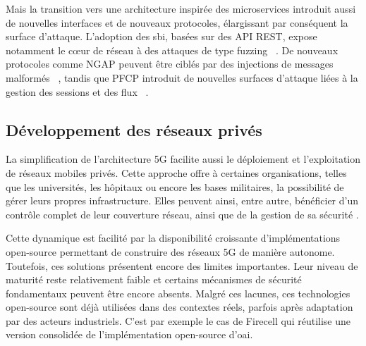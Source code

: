 \documentclass[a4paper,11pt,twoside]{StyleThese}
\begin{document}
Mais la transition vers une architecture inspirée des microservices introduit aussi de nouvelles interfaces et de nouveaux protocoles, élargissant par conséquent la surface d’attaque. L’adoption des \gls{sbi}, basées sur des API REST, expose notamment le cœur de réseau à des attaques de type fuzzing ~\cite{CTD5G}. De nouveaux protocoles comme NGAP peuvent être ciblés par des injections de messages malformés ~\cite{salazar2023network}, tandis que PFCP introduit de nouvelles surfaces d’attaque liées à la gestion des sessions et des flux ~\cite{amponis20235g}.


\subsection{Développement des réseaux privés}
La simplification de l'architecture 5G facilite aussi le déploiement et l’exploitation de réseaux mobiles privés. Cette approche offre à certaines organisations, telles que les universités, les hôpitaux ou encore les bases militaires, la possibilité de gérer leurs propres infrastructure. Elles peuvent ainsi, entre autre, bénéficier d’un contrôle complet de leur couverture réseau, ainsi que de la gestion de sa sécurité \cite{priv5G}. 

Cette dynamique est facilité par la disponibilité croissante d’implémentations open-source permettant de construire des réseaux 5G de manière autonome. Toutefois, ces solutions présentent encore des limites importantes. Leur niveau de maturité reste relativement faible et certains mécanismes de sécurité fondamentaux peuvent être encore absents. Malgré ces lacunes, ces technologies open-source sont déjà utilisées dans des contextes réels, parfois après adaptation par des acteurs industriels. C'est par exemple le cas de Firecell \cite{firecell} qui réutilise une version consolidée de l'implémentation open-source d'\gls{oai}\cite{oai}. 
\end{document}
